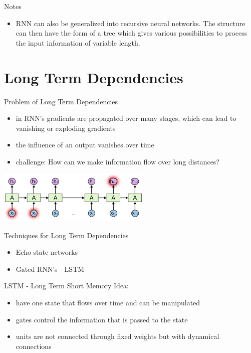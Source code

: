 \begin{frame}[beamer:0]{Notes}
\begin{itemize}
\item RNN can also be generalized into recursive neural networks. The structure can then have the form of a tree which gives various possibilities to process the input information of variable length.
\end{itemize}
\end{frame}

\section{Long Term Dependencies}
\begin{frame}
\sectionpage
\end{frame}

\begin{frame}{Problem of Long Term Dependencies}
\begin{itemize}
\item in RNN's gradients are propagated over many stages, which can lead to vanishing or exploding gradients
\item the influence of an output vanishes over time 
\item challenge: How can we make information flow over long distances?
\end{itemize}
\includegraphics[height=2.5cm]{data/RNN-longtermdependencies.png}
\end{frame}

\begin{frame}{Techniques for Long Term Dependencies}
\begin{itemize}
\item Echo state networks
\item Gated RNN's - LSTM
\end{itemize}
\end{frame}

\begin{frame}{LSTM - Long Term Short Memory}
Idea: 
\begin{itemize}
\item have one state that flows over time and can be manipulated
\item gates control the information that is passed to the state
\item units are not connected through fixed weights but with dynamical connections
\end{itemize}
\end{frame}


